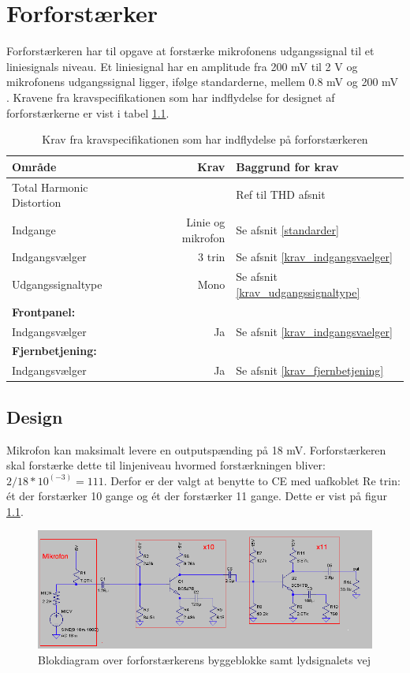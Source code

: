 \chapter{Forforstærker}

Forforstærkeren har til opgave at forstærke mikrofonens udgangssignal til et liniesignals niveau. Et liniesignal har en amplitude fra 200 mV til 2 V og mikrofonens udgangssignal ligger, ifølge standarderne, mellem 0.8 mV og 200 mV . 
Kravene fra kravspecifikationen som har indflydelse for designet af forforstærkerne er vist i tabel \ref{tab:krav_forforstaerker}.

\begin{table}[h]
\centering
\begin{tabular}{l|r|l}
\hline\hline
Område & Krav & Baggrund for krav \\
\hline\hline
Total Harmonic Distortion & \color{red}{<1 \%} & Ref til THD afsnit \\
Indgange & Linie og mikrofon & Se afsnit \ref{standarder} \\
Indgangsvælger & 3 trin & Se afsnit \ref{krav_indgangsvaelger} \\
Udgangssignaltype & Mono & Se afsnit \ref{krav_udgangssignaltype} \\
\textbf{Frontpanel:} & & \\
Indgangsvælger & Ja & Se afsnit \ref{krav_indgangsvaelger} \\
\textbf{Fjernbetjening:} & & \\
Indgangsvælger & Ja &  Se afsnit \ref{krav_fjernbetjening}\\
\hline\hline
\end{tabular}
\caption{Krav fra kravspecifikationen som har indflydelse på forforstærkeren}
\label{tab:krav_forforstaerker}
\end{table}



\section{Design}
Mikrofon kan maksimalt levere en outputspænding på 18 mV. Forforstærkeren skal forstærke dette til linjeniveau hvormed forstærkningen bliver: $2/18*10^(-3)=111$. Derfor er der valgt at benytte to CE med uafkoblet Re trin: ét der forstærker 10 gange og ét der forstærker 11 gange. Dette er vist på figur \ref{blok_forforstaerker}.

\begin{figure}[h]
\centering
\includegraphics[scale=.6]{implementering/forforstaerker/blok_forforstaerker.png}
\caption{Blokdiagram over forforstærkerens byggeblokke samt lydsignalets vej}
\label{blok_forforstaerker}
\end{figure}

